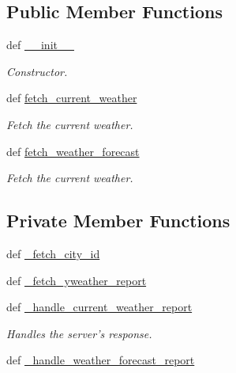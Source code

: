 \subsection*{Public Member Functions}
\begin{DoxyCompactItemize}
\item 
def \hyperlink{classrapp__weather__reporter_1_1yweather__reporter_1_1YWeatherReporter_a0c4ff58a30af27079c7048d808312444}{\-\_\-\-\_\-init\-\_\-\-\_\-}
\begin{DoxyCompactList}\small\item\em Constructor. \end{DoxyCompactList}\item 
def \hyperlink{classrapp__weather__reporter_1_1yweather__reporter_1_1YWeatherReporter_a13560e82bcc5a1cf82b211ef27b9a482}{fetch\-\_\-current\-\_\-weather}
\begin{DoxyCompactList}\small\item\em Fetch the current weather. \end{DoxyCompactList}\item 
def \hyperlink{classrapp__weather__reporter_1_1yweather__reporter_1_1YWeatherReporter_aa8f8e6a7e7476640155e8a78bbab6877}{fetch\-\_\-weather\-\_\-forecast}
\begin{DoxyCompactList}\small\item\em Fetch the current weather. \end{DoxyCompactList}\end{DoxyCompactItemize}
\subsection*{Private Member Functions}
\begin{DoxyCompactItemize}
\item 
def \hyperlink{classrapp__weather__reporter_1_1yweather__reporter_1_1YWeatherReporter_a833054b8b849a0a0e8f480b97f8beaf2}{\-\_\-fetch\-\_\-city\-\_\-id}
\item 
def \hyperlink{classrapp__weather__reporter_1_1yweather__reporter_1_1YWeatherReporter_af97f060d2e1d4d7e6f4572a3cfb80597}{\-\_\-fetch\-\_\-yweather\-\_\-report}
\item 
def \hyperlink{classrapp__weather__reporter_1_1yweather__reporter_1_1YWeatherReporter_a9ea1a9fd70eb9d9efd860bd9900c54b4}{\-\_\-handle\-\_\-current\-\_\-weather\-\_\-report}
\begin{DoxyCompactList}\small\item\em Handles the server's response. \end{DoxyCompactList}\item 
def \hyperlink{classrapp__weather__reporter_1_1yweather__reporter_1_1YWeatherReporter_a6901aa294627f5a3e736dd72f88e9f5a}{\-\_\-handle\-\_\-weather\-\_\-forecast\-\_\-report}
\end{DoxyCompactItemize}
